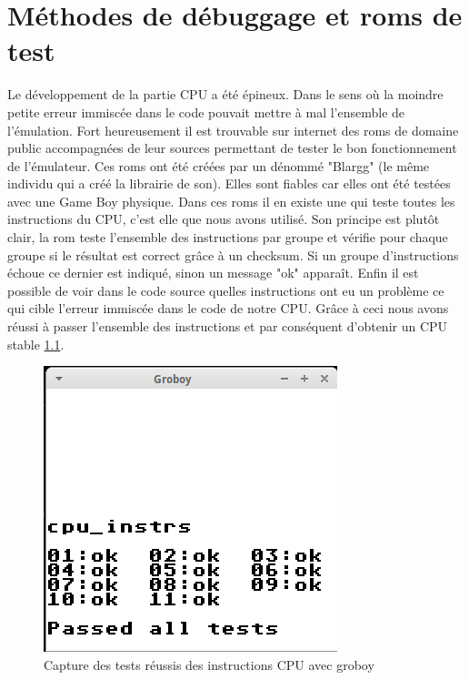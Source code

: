 \documentclass{report}
\begin{document}
\chapter{Méthodes de débuggage et roms de test}
Le développement de la partie CPU a été épineux. Dans le sens où la moindre petite erreur immiscée dans le code pouvait mettre à mal l'ensemble de l'émulation. Fort heureusement il est trouvable sur internet des roms de domaine public accompagnées de leur sources permettant de tester le bon fonctionnement de l'émulateur. Ces roms ont été créées par un dénommé "Blargg" (le même individu qui a créé la librairie de son). Elles sont fiables car elles ont été testées avec une Game Boy physique. Dans ces roms il en existe une qui teste toutes les instructions du CPU, c'est elle que nous avons utilisé. Son principe est plutôt clair, la rom teste l'ensemble des instructions par groupe et vérifie pour chaque groupe si le résultat est correct grâce à un checksum. Si un groupe d'instructions échoue ce dernier est indiqué, sinon un message "ok" apparaît. Enfin il est possible de voir dans le code source quelles instructions ont eu un problème ce qui cible l'erreur immiscée dans le code de notre CPU. Grâce à ceci nous avons réussi à passer l'ensemble des instructions et par conséquent d'obtenir un CPU stable \ref{testcpu}.
\begin{figure}[!h]
\centering
\includegraphics[scale=0.4]{images/screenshot_cpu_blargg.png}
\caption{Capture des tests réussis des instructions CPU avec groboy}
\label{testcpu}
\end{figure}
\end{document}
